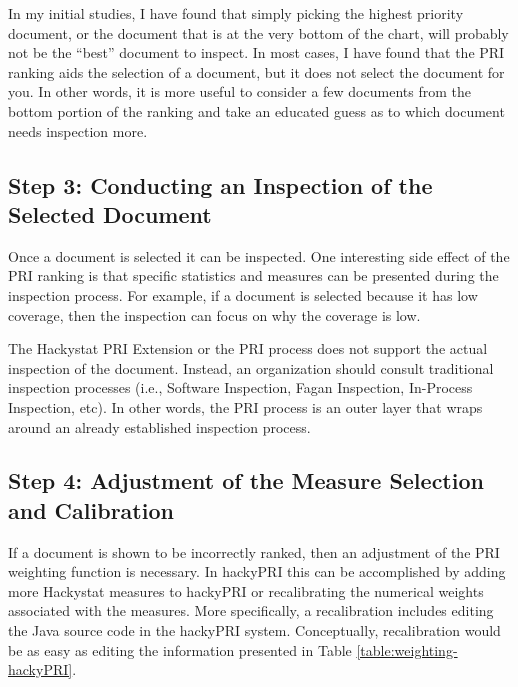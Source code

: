 In my initial studies, I have found that simply picking the highest
priority document, or the document that is at the very bottom of the chart,
will probably not be the ``best'' document to inspect. In most cases, I
have found that the PRI ranking aids the selection of a document, but it
does not select the document for you. In other words, it is more useful to
consider a few documents from the bottom portion of the ranking and take an
educated guess as to which document needs inspection more.

\subsection{Step 3: Conducting an Inspection of the Selected Document}
Once a document is selected it can be inspected. One interesting side
effect of the PRI ranking is that specific statistics and measures can be
presented during the inspection process. For example, if a document is
selected because it has low coverage, then the inspection can focus on why
the coverage is low.

The Hackystat PRI Extension or the PRI process does not support the actual
inspection of the document. Instead, an organization should consult
traditional inspection processes (i.e., Software Inspection, Fagan
Inspection, In-Process Inspection, etc). In other words, the PRI process is
an outer layer that wraps around an already established inspection process.

\subsection{Step 4: Adjustment of the Measure Selection and Calibration}
If a document is shown to be incorrectly ranked, then an adjustment of the
PRI weighting function is necessary. In hackyPRI this can be accomplished
by adding more Hackystat measures to hackyPRI or recalibrating the
numerical weights associated with the measures. More specifically, a
recalibration includes editing the Java source code in the hackyPRI system.
Conceptually, recalibration would be as easy as editing the information
presented in Table \ref{table:weighting-hackyPRI}.







